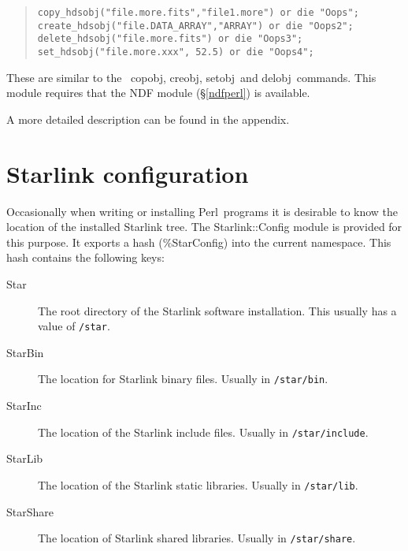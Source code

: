 \documentclass[twoside,11pt]{article}
\newenvironment{myquote}{\begin{quote}\begin{small}}{\end{small}\end{quote}}
\newcommand{\task}[1]{{\sf #1}}
\newcommand{\Figaro}{\xref{{\sc{Figaro}}}{sun86}{}}
\newcommand{\perl}{\xref{\textsf{Perl}}{sun193}{}}
\newcommand{\delobj}{\xref{\task{delobj}}{sun86}{DELOBJ}}
\newcommand{\creobj}{\xref{\task{creobj}}{sun86}{CREOBJ}}
\newcommand{\setobj}{\xref{\task{setobj}}{sun86}{SETOBJ}}
\newcommand{\copobj}{\xref{\task{copobj}}{sun86}{COPOBJ}}
\newcommand{\xref}[3]{#1}
\renewcommand{\_}{\texttt{\symbol{95}}}
\begin{document}
\begin{myquote}
\begin{verbatim}
copy_hdsobj("file.more.fits","file1.more") or die "Oops";
create_hdsobj("file.DATA_ARRAY","ARRAY") or die "Oops2";
delete_hdsobj("file.more.fits") or die "Oops3";
set_hdsobj("file.more.xxx", 52.5) or die "Oops4";
\end{verbatim}
\end{myquote}
 
These are similar to the \Figaro\ \copobj, \creobj, \setobj\ and \delobj\ 
commands.  This module requires that the NDF module (\S\ref{ndfperl}) is
available.

A more detailed description can be found in the appendix.

\section{Starlink configuration}

Occasionally when writing or installing \perl\ programs it is desirable to
know the location of the installed Starlink tree. The Starlink::Config module
is provided for this purpose. It exports a hash (\%StarConfig) into the
current namespace. This hash contains the following keys:

\begin{description}
\item[Star] \mbox{}

    The root directory of the Starlink software
    installation.  This usually has a value of \texttt{/star}.

\item[Star\_Bin] \mbox{}

    The location for Starlink binary files. Usually in
    \texttt{/star/bin}.

\item[Star\_Inc] \mbox{}

    The location of the Starlink include files. Usually in
    \texttt{/star/include}.

\item[Star\_Lib] \mbox{}

    The location of the Starlink static libraries. Usually
    in \texttt{/star/lib}.

\item[Star\_Share] \mbox{}
    The location of Starlink shared libraries. Usually in
    \texttt{/star/share}.

\end{description}
\end{document}

